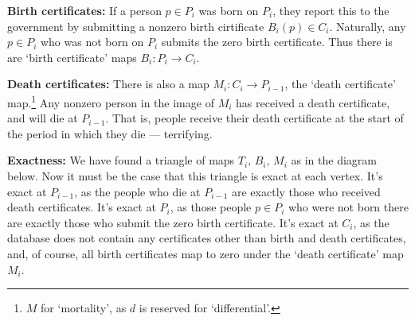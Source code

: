 \documentclass[11pt]{article}
\begin{document}
\Bullet \textbf{Birth certificates:} If a person $p\in P_{i}$ was born on $P_i$,
they report this to the government by submitting a nonzero birth cirtificate
$B_{i}(p)\in C_i$. Naturally, any $p\in P_{i}$ who was not born on $P_i$ submits
the zero birth certificate. Thus there is are `birth certificate' maps
$B_i:P_i\to C_i$.

\Bullet \textbf{Death certificates:} There is also a map $M_{i}:C_{i}\to
P_{i-1}$, the `death certificate' map.\footnote{$M$ for `mortality', as $d$ is
reserved for `differential'.} Any nonzero person in the image of $M_{i}$ has
received a death certificate, and will die at $P_{i-1}$. That is, people receive
their death certificate at the start of the period in which they die ---
terrifying.

\Bullet \textbf{Exactness:} We have found a triangle of maps
$T_{i},\,B_{i},\,M_{i}$ as in the diagram below. Now it must be the case that
this triangle is exact at each vertex. It's exact at $P_{i-1}$, as the people
who die at $P_{i-1}$ are exactly those who received death certificates. It's
exact at $P_i$, as those people $p\in P_i$ who were not born there are exactly
those who submit the zero birth certificate. It's exact at $C_i$, as the
database does not contain any certificates other than birth and death
certificates, and, of course, all birth certificates map to zero under the
`death certificate' map $M_i$.
\end{document}
